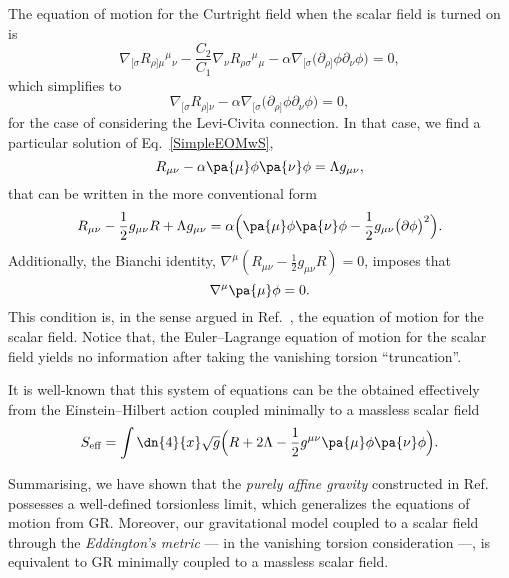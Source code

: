 \documentclass[aps,prl,twocolumn,superscriptaddress,showpacs,showkeys]{revtex4-1}
\begin{document}
The equation of motion for the Curtright field when the scalar field is turned on is
\begin{equation*}
  \nabla_{[\sigma} R_{\rho]\mu}{}^{\mu}{}_\nu - \frac{C_2}{C_1} \nabla_\nu  R_{\rho\sigma}{}^{\mu}{}_\mu - \alpha \nabla_{[\sigma} \Big( \partial_{\rho]}\phi \partial_\nu\phi \Big) = 0,
\end{equation*}
which simplifies to 
\begin{equation}
  \nabla_{[\sigma} R_{\rho]\nu} - \alpha \nabla_{[\sigma} \Big( \partial_{\rho]}\phi \partial_\nu\phi \Big) = 0,
  \label{SimpleEOMwS}
\end{equation}
for the case of considering the Levi-Civita connection. In that case, we find a particular solution of Eq.~\eqref{SimpleEOMwS},
\begin{equation*}
  R_{\mu\nu} - \alpha \pa{\mu} \phi \pa{\nu} \phi = \Lambda g_{\mu\nu},
\end{equation*}
that can be written in the more conventional form
\begin{equation}
  R_{\mu\nu} - \frac{1}{2} g_{\mu\nu} R + \Lambda g_{\mu\nu} = \alpha \Big( \pa{\mu} \phi \pa{\nu} \phi - \frac{1}{2} g_{\mu\nu} \big( \partial\phi \big)^2 \Big).
\end{equation}
Additionally, the Bianchi identity, \mbox{$\nabla^\mu \left( R_{\mu\nu} - \frac{1}{2} g_{\mu\nu} R \right) = 0$,} imposes that
\begin{equation}
  \nabla^\mu \pa{\mu} \phi = 0.
\end{equation}
This condition is, in the sense argued in Ref.~\cite{Bekenstein:2014uwa}, the equation of motion for the scalar field. Notice that, the Euler--Lagrange equation of motion for the scalar field yields no information after taking the vanishing torsion ``truncation''.

It is well-known that this system of equations can be the obtained effectively from the Einstein--Hilbert action coupled minimally to a massless scalar field
\begin{equation}
  S_{\text{eff}} = \int \dn{4}{x} \sqrt{g} \Big( R + 2 \Lambda - \frac{1}{2} g^{\mu\nu} \pa{\mu}\phi \pa{\nu} \phi \Big).
\end{equation}

Summarising, we have shown that the  \emph{purely affine gravity} constructed in Ref.~\cite{} possesses a well-defined torsionless limit, which generalizes the equations of motion  from GR. Moreover, our gravitational model coupled to a scalar field through the \emph{Eddington's metric} --- in the vanishing torsion consideration ---, is equivalent to GR minimally coupled to a massless scalar field.
\end{document}
